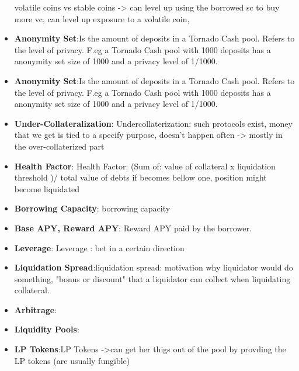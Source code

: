 \documentclass{article}
\begin{document}
\begin{itemize}
    
    
volatile coins vs stable coins -> can level up using the borrowed sc to buy more vc, can level up exposure to a volatile coin,

\item \textbf{Anonymity Set}:Is the amount of deposits in a Tornado Cash pool. Refers to the level of privacy. F.eg a Tornado Cash pool with 1000 deposits has a anonymity set size of 1000 and a privacy level of 1/1000.

\item \textbf{Anonymity Set}:Is the amount of deposits in a Tornado Cash pool. Refers to the level of privacy. F.eg a Tornado Cash pool with 1000 deposits has a anonymity set size of 1000 and a privacy level of 1/1000.

\item \textbf{Under-Collateralization}: Undercollaterization: such protocols exist, money that we get is tied to a specify purpose, doesn't happen often -> mostly in the over-collaterized part 

\item \textbf{Health Factor}: Health Factor: 
    (Sum of:  value of collateral x liquidation threshold )/ total value of debts
    if becomes bellow one, position might become liquidated

\item \textbf{Borrowing Capacity}: borrowing capacity

\item \textbf{Base APY, Reward APY}:
 Reward APY paid by the borrower.
 
\item \textbf{Leverage}: Leverage : bet in a certain direction

\item \textbf{Liquidation Spread}:liquidation spread: motivation why liquidator would do something,
"bonus or discount" that a liquidator can collect when liquidating collateral.

\item \textbf{Arbitrage}:


\item \textbf{Liquidity Pools}:

\item \textbf{LP Tokens}:LP Tokens ->can get her thigs out of the pool by provding the LP tokens (are usually fungible)


\end{itemize}
\end{document}
